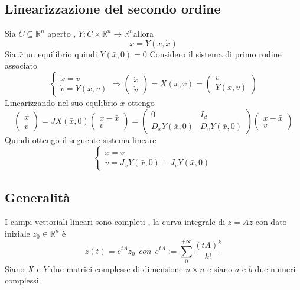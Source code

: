 \documentclass{article}
\theoremstyle{definition}
\newcommand{\R}{\mathbb{R}}
\newcommand{\Rn}{\R^n}
\begin{document}
\subsection{Linearizzazione del secondo ordine }
Sia $C \subseteq \Rn$ aperto , $Y: C \times \Rn \rightarrow \Rn$allora 
$$\ddot{x}=Y(x,\dot{x})$$
Sia $\bar{x}$ un equilibrio quindi $Y(\bar{x},0)=0$ 
Considero il sistema di primo rodine associato 
$$\begin{cases}
	\dot{x}=v\\
	\dot{v}=Y(x,v) 
\end{cases}\Rightarrow \begin{pmatrix}
\dot{x} \\
\dot{v}
\end{pmatrix} = X(x,v)= \begin{pmatrix}
v\\
Y(x,v)
\end{pmatrix}$$
Linearizzando nel suo equlibrio $\bar{x}$ ottengo 
$$
\begin{pmatrix}
	\dot{x}\\
	\dot{v}
\end{pmatrix}=JX(\bar{x},0)\begin{pmatrix}
x- \bar{x} \\
v 
\end{pmatrix}= 
\begin{pmatrix}
0 & I_d \\
D_xY(\bar{x},0) & D_vY(\bar{x},0)
\end{pmatrix}
\begin{pmatrix}
x- \bar{x} \\
v 
\end{pmatrix}
$$
Quindi ottengo il seguente sistema lineare 
$$\begin{cases}
	\dot{x}=v \\
	\dot{v}=J_xY(\bar{x},0)+J_vY(\bar{x},0)
\end{cases}$$
\subsection{Generalità}
I campi vettoriali lineari sono completi , la curva integrale di $\dot{z}=Az$ con dato iniziale $z_0 \in \Rn$  è 
$$z(t)=e^{tA} z_0 \ \ con \ \ e^{tA}:= \sum_0^{+\infty} \frac{(tA)^k}{k!}$$ 
Siano \( X \) e \( Y \) due matrici complesse di dimensione \( n \times n \) e siano \( a \) e \( b \) due numeri complessi. 
\end{document}
